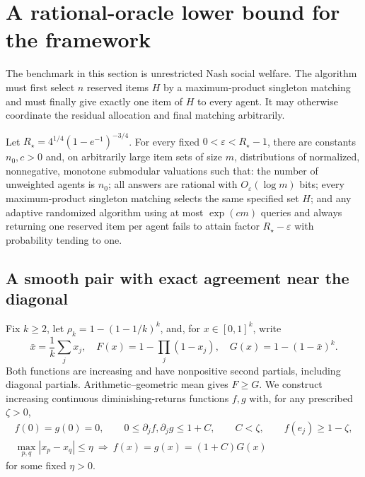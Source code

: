 \section{A rational-oracle lower bound for the framework}
\label{simp:lower-bound}

The benchmark in this section is unrestricted Nash social welfare.
The algorithm must first select $n$ reserved items $H$ by a
maximum-product singleton matching and must finally give exactly
one item of $H$ to every agent.  It may otherwise coordinate the
residual allocation and final matching arbitrarily.

\begin{theorem}\label{thm:simp-framework-lower-bound}
Let $R_\star=4^{1/4}(1-e^{-1})^{-3/4}$.  For every fixed
$0<\varepsilon<R_\star-1$, there are constants $n_0,c>0$ and,
on arbitrarily large item sets of size $m$, distributions of
normalized, nonnegative, monotone submodular valuations such that:
the number of unweighted agents is $n_0$; all answers are rational
with $O_\varepsilon(\log m)$ bits; every maximum-product singleton
matching selects the same specified set $H$; and any adaptive
randomized algorithm using at most $\exp(cm)$ queries and always
returning one reserved item per agent fails to attain factor
$R_\star-\varepsilon$ with probability tending to one.
\end{theorem}

\subsection{A smooth pair with exact agreement near the diagonal}

Fix $k\ge2$, let $\rho_k=1-(1-1/k)^k$, and, for
$x\in[0,1]^k$, write
\[
 \bar x=\frac1k\sum_jx_j,\quad
 F(x)=1-\prod_j(1-x_j),\quad G(x)=1-(1-\bar x)^k.
\]
Both functions are increasing and have nonpositive second partials,
including diagonal partials.  Arithmetic--geometric mean gives $F\ge G$.
We construct increasing continuous diminishing-returns functions
$f,g$ with, for any prescribed $\zeta>0$,
\begin{equation}\label{simp:masked-properties}
 \begin{gathered}
 f(0)=g(0)=0,\qquad 0\le\partial_jf,\partial_jg\le1+C,
 \qquad C<\zeta,\qquad f(e_j)\ge1-\zeta,\\
 \max_{p,q}|x_p-x_q|\le\eta
       \ \Longrightarrow\ f(x)=g(x)=(1+C)G(x)
 \end{gathered}
\end{equation}
for some fixed $\eta>0$.

